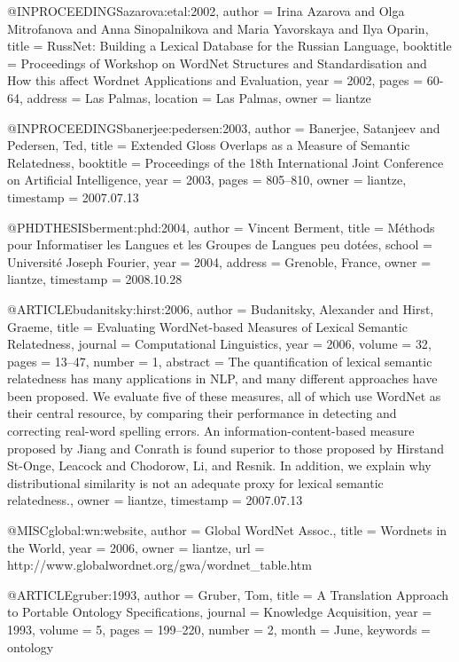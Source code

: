 @INPROCEEDINGS{azarova:etal:2002,
  author = {Irina Azarova and Olga Mitrofanova and Anna Sinopalnikova and Maria
	Yavorskaya and Ilya Oparin},
  title = {{RussNet}: Building a Lexical Database for the {Russian} Language},
  booktitle = {Proceedings of Workshop on WordNet Structures and Standardisation
	and How this affect Wordnet Applications and Evaluation},
  year = {2002},
  pages = {60-64},
  address = {Las Palmas},
  location = {Las Palmas},
  owner = {liantze}
}

@INPROCEEDINGS{banerjee:pedersen:2003,
  author = {Banerjee, Satanjeev and Pedersen, Ted},
  title = {Extended Gloss Overlaps as a Measure of Semantic Relatedness},
  booktitle = {Proceedings of the 18th International Joint Conference on Artificial
	Intelligence},
  year = {2003},
  pages = {805--810},
  owner = {liantze},
  timestamp = {2007.07.13}
}

@PHDTHESIS{berment:phd:2004,
  author = {Vincent Berment},
  title = {\foreignlanguage{french}{M\'{e}thods pour Informatiser les Langues
	et les Groupes de Langues \og{}peu dot\'{e}es\fg{}}},
  school = {Universit\'{e} Joseph Fourier},
  year = {2004},
  address = {Grenoble, France},
  owner = {liantze},
  timestamp = {2008.10.28}
}

@ARTICLE{budanitsky:hirst:2006,
  author = {Budanitsky, Alexander and Hirst, Graeme},
  title = {Evaluating {WordNet}-based Measures of Lexical Semantic Relatedness},
  journal = {Computational Linguistics},
  year = {2006},
  volume = {32},
  pages = {13--47},
  number = {1},
  abstract = {The quantification of lexical semantic relatedness has many applications
	in NLP, and many different approaches have been proposed. We evaluate
	five of these measures, all of which use WordNet as their central
	resource, by comparing their performance in detecting and correcting
	real-word spelling errors. An information-content-based measure proposed
	by Jiang and Conrath is found superior to those proposed by Hirstand
	St-Onge, Leacock and Chodorow, Li, and Resnik. In addition, we explain
	why distributional similarity is not an adequate proxy for lexical
	semantic relatedness.},
  owner = {liantze},
  timestamp = {2007.07.13}
}

@MISC{global:wn:website,
  author = {{Global WordNet Assoc.}},
  title = {Wordnets in the World},
  year = {2006},
  owner = {liantze},
  url = {http://www.globalwordnet.org/gwa/wordnet_table.htm}
}

@ARTICLE{gruber:1993,
  author = {Gruber, Tom},
  title = {A Translation Approach to Portable Ontology Specifications},
  journal = {Knowledge Acquisition},
  year = {1993},
  volume = {5},
  pages = {199--220},
  number = {2},
  month = {June},
  keywords = {ontology}
}

